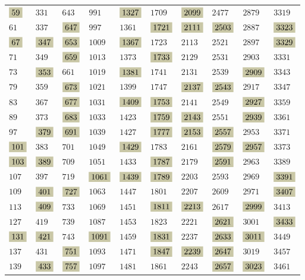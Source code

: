 \documentclass{article}
\numberwithin{equation}{section}
\newcommand{\highlight}[1]{\colorbox{shadecolor}{$\displaystyle #1$}}
\theoremstyle{definition}
\begin{document}
\begin{center}
{\begin{tabular}{x{1cm}x{1cm}x{1cm}x{1cm}x{1cm}x{1cm}x{1cm}x{1cm}x{1cm}x{1cm}}
      $\highlight{59}$ & $331$ & $643$ & $991$ & $\highlight{1327}$ & $1709$ & $\highlight{2099}$ & $2477$ & $2879$ & $3319$ \tabularnewline
      $61$ & $337$ & $\highlight{647}$ & $997$ & $1361$ & $\highlight{1721}$ & $\highlight{2111}$ & $\highlight{2503}$ & $2887$ & $\highlight{3323}$ \tabularnewline
      $\highlight{67}$ & $\highlight{347}$ & $\highlight{653}$ & $1009$ & $\highlight{1367}$ & $1723$ & $2113$ & $2521$ & $2897$ & $\highlight{3329}$ \tabularnewline
      $71$ & $349$ & $\highlight{659}$ & $1013$ & $1373$ & $\highlight{1733}$ & $2129$ & $2531$ & $2903$ & $3331$ \tabularnewline
      $73$ & $\highlight{353}$ & $661$ & $1019$ & $\highlight{1381}$ & $1741$ & $2131$ & $2539$ & $\highlight{2909}$ & $3343$ \tabularnewline
      $79$ & $359$ & $\highlight{673}$ & $1021$ & $1399$ & $1747$ & $\highlight{2137}$ & $\highlight{2543}$ & $2917$ & $3347$ \tabularnewline
      $83$ & $367$ & $\highlight{677}$ & $1031$ & $\highlight{1409}$ & $\highlight{1753}$ & $2141$ & $2549$ & $\highlight{2927}$ & $3359$ \tabularnewline
      $89$ & $373$ & $\highlight{683}$ & $1033$ & $1423$ & $\highlight{1759}$ & $\highlight{2143}$ & $2551$ & $\highlight{2939}$ & $3361$ \tabularnewline
      $97$ & $\highlight{379}$ & $\highlight{691}$ & $1039$ & $1427$ & $\highlight{1777}$ & $\highlight{2153}$ & $\highlight{2557}$ & $2953$ & $3371$ \tabularnewline
      $\highlight{101}$ & $383$ & $701$ & $1049$ & $\highlight{1429}$ & $1783$ & $2161$ & $\highlight{2579}$ & $\highlight{2957}$ & $3373$ \tabularnewline
      $\highlight{103}$ & $\highlight{389}$ & $709$ & $1051$ & $1433$ & $\highlight{1787}$ & $2179$ & $\highlight{2591}$ & $2963$ & $3389$ \tabularnewline
      $107$ & $397$ & $719$ & $\highlight{1061}$ & $\highlight{1439}$ & $\highlight{1789}$ & $2203$ & $2593$ & $2969$ & $\highlight{3391}$ \tabularnewline
      $109$ & $\highlight{401}$ & $\highlight{727}$ & $1063$ & $1447$ & $1801$ & $2207$ & $2609$ & $2971$ & $\highlight{3407}$ \tabularnewline
      $113$ & $\highlight{409}$ & $733$ & $1069$ & $1451$ & $\highlight{1811}$ & $\highlight{2213}$ & $2617$ & $\highlight{2999}$ & $3413$ \tabularnewline
      $127$ & $419$ & $739$ & $1087$ & $1453$ & $1823$ & $2221$ & $\highlight{2621}$ & $3001$ & $\highlight{3433}$ \tabularnewline
      $\highlight{131}$ & $\highlight{421}$ & $743$ & $\highlight{1091}$ & $1459$ & $\highlight{1831}$ & $2237$ & $\highlight{2633}$ & $\highlight{3011}$ & $3449$ \tabularnewline
      $137$ & $431$ & $\highlight{751}$ & $1093$ & $1471$ & $\highlight{1847}$ & $\highlight{2239}$ & $\highlight{2647}$ & $3019$ & $3457$ \tabularnewline
      $139$ & $\highlight{433}$ & $\highlight{757}$ & $1097$ & $1481$ & $1861$ & $2243$ & $\highlight{2657}$ & $\highlight{3023}$ & $3461$ \tabularnewline

\end{tabular}}
\end{center}
\end{document}
